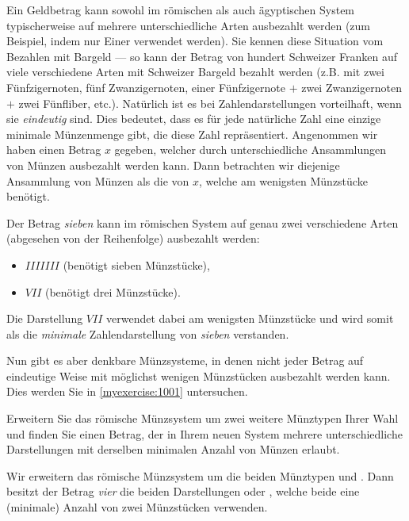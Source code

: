 Ein Geldbetrag kann sowohl im römischen als auch ägyptischen System typischerweise auf mehrere unterschiedliche Arten
ausbezahlt werden (zum Beispiel, indem nur Einer verwendet werden). Sie kennen diese Situation vom Bezahlen mit
Bargeld --- so kann der Betrag von hundert Schweizer Franken auf viele verschiedene Arten mit Schweizer Bargeld bezahlt werden
(z.B. mit zwei Fünfzigernoten, fünf Zwanzigernoten, einer Fünfzigernote $+$ zwei Zwanzigernoten $+$ zwei Fünfliber, etc.). Natürlich ist
es bei Zahlendarstellungen vorteilhaft, wenn sie \textit{eindeutig} sind. Dies bedeutet, dass es für jede natürliche Zahl eine einzige minimale Münzenmenge gibt, die diese Zahl repräsentiert. Angenommen wir haben einen Betrag $x$ gegeben, welcher durch
unterschiedliche Ansammlungen von Münzen ausbezahlt werden kann. Dann betrachten wir diejenige Ansammlung von Münzen als
die  von $x$, welche am wenigsten Münzstücke benötigt.

\begin{myexample}\label{myexample:notUnique}
Der Betrag \textit{sieben} kann im römischen System auf genau zwei verschiedene Arten (abgesehen von der Reihenfolge) ausbezahlt werden:
\begin{itemize}
	\item $IIIIIII$ (benötigt sieben Münzstücke),
	\item $VII$ (benötigt drei Münzstücke).
\end{itemize}
Die Darstellung $VII$ verwendet dabei am wenigsten Münzstücke und wird somit als die \textit{minimale} Zahlendarstellung von
\textit{sieben} verstanden.
\end{myexample}
Nun gibt es aber denkbare Münzsysteme, in denen nicht jeder Betrag auf eindeutige Weise mit möglichst wenigen
Münzstücken ausbezahlt werden kann. Dies werden Sie in \cref{myexercise:1001} untersuchen.

\begin{myexercise}\label{myexercise:1001}
	Erweitern Sie das römische Münzsystem um zwei weitere Münztypen Ihrer Wahl und finden Sie einen Betrag, der in Ihrem
	neuen System mehrere unterschiedliche Darstellungen mit derselben minimalen Anzahl von Münzen erlaubt.
	\begin{myanswer}
		Wir erweitern das römische Münzsystem um die beiden Münztypen  und . Dann besitzt der Betrag
		\textit{vier} die beiden Darstellungen  oder \coin{II}, welche beide eine (minimale) Anzahl von zwei Münzstücken verwenden.
	\end{myanswer}
\end{myexercise}


